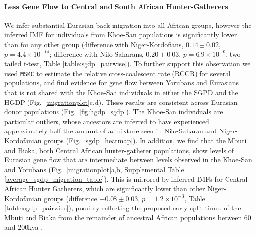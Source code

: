 \documentclass{article}
\begin{document}
\paragraph{Less Gene Flow to Central and South African Hunter-Gatherers} We infer substantial Eurasian back-migration into all African groups, however the inferred IMF for individuals from Khoe-San populations is significantly lower than for any other group (difference with Niger-Kordofians, $0.14 \pm 0.02$, $p = 4.4 \times 10^{-14}$; difference with Nilo-Saharans, $0.20 \pm 0.03$, $p = 6.9 \times 10^{-9}$, two-tailed t-test, Table \ref{table:sgdp_pairwise}). To further support this observation we used {\tt MSMC} to estimate the relative cross-coalescent rate (RCCR) for several populations, and find evidence for gene flow between Yorubans and Eurasians that is not shared with the Khoe-San individuals in either the SGPD and the HGDP (Fig.\ \ref{migrationplot}c,d). These results are consistent across Eurasian donor populations (Fig.\ \ref{fig:hgdp_sgdp}). The Khoe-San individuals are particular outliers, whose ancestors are inferred to have experienced approximately half the amount of admixture seen in Nilo-Saharan and Niger-Kordofanian groups (Fig.\ \ref{sgdp_heatmap}). 
In addition, we find that the Mbuti and Biaka, both Central African hunter-gatherer populations, show levels of Eurasian gene flow that are intermediate between levels observed in the Khoe-San and Yorubans (Fig.\ \ref{migrationplot}a,b, Supplemental Table \ref{average_sgdp_migration_table}).  This is mirrored by inferred IMFs for Central African Hunter Gatherers, which are significantly lower than other Niger-Kordofanian groups (difference $-0.08 \pm 0.03$, $p = 1.2 \times 10^{-3}$, Table \ref{table:sgdp_pairwise}), possibly reflecting the proposed early split times of the Mbuti and Biaka from the remainder of ancestral African populations between 60 and 200kya \cite{Patin2017, Lipson2019}. 
\end{document}
